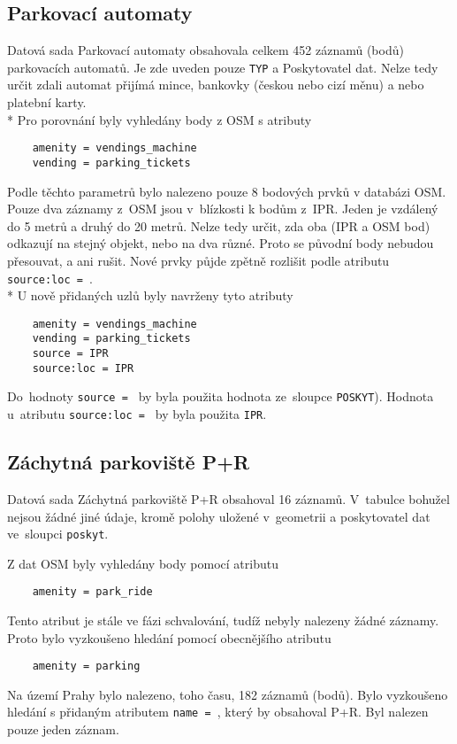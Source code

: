 \subsection{Parkovací automaty}
\label{Parkovací automaty}
Datová sada Parkovací automaty obsahovala celkem 452 záznamů (bodů)
parkovacích automatů. Je zde uveden pouze {\tt TYP} a Poskytovatel dat.
Nelze tedy určit zdali automat přijímá mince, bankovky (českou nebo
cizí měnu) a nebo platební karty.
\\*
Pro porovnání byly vyhledány body z OSM s atributy
\begin{verbatim}
    amenity = vendings_machine
    vending = parking_tickets
\end{verbatim}
Podle těchto parametrů bylo nalezeno pouze 8 bodových prvků v databázi
OSM. Pouze dva záznamy z~OSM jsou v~blízkosti k bodům z~IPR. Jeden je
vzdálený do 5 metrů a druhý do 20 metrů. Nelze tedy určit, zda oba (IPR
a OSM bod) odkazují na stejný objekt, nebo na dva různé. Proto se
původní body nebudou přesouvat, a ani rušit. Nové prvky půjde zpětně
rozlišit podle atributu {\tt source:loc~= }.
\\*
U nově přidaných uzlů byly navrženy tyto atributy
\begin{verbatim}
    amenity = vendings_machine
    vending = parking_tickets
    source = IPR
    source:loc = IPR
\end{verbatim}
Do~hodnoty {\tt source~= } by byla použita hodnota ze~sloupce
{\tt POSKYT}). Hodnota u~atributu {\tt source:loc~= } by byla použita
{\tt IPR}.

\subsection{Záchytná parkoviště P+R}
\label{Záchytná parkoviště P+R}
Datová sada Záchytná parkoviště P+R obsahoval 16 záznamů. V~tabulce
bohužel nejsou žádné jiné údaje, kromě polohy uložené v~geometrii a
poskytovatel dat ve~sloupci {\tt poskyt}.

Z dat OSM byly vyhledány body pomocí atributu
\begin{verbatim}
    amenity = park_ride
\end{verbatim}
Tento atribut je stále ve fázi schvalování, tudíž nebyly nalezeny
žádné záznamy. 
Proto bylo vyzkoušeno hledání pomocí obecnějšího atributu
\begin{verbatim}
    amenity = parking
\end{verbatim}
Na území Prahy bylo nalezeno, toho času, 182 záznamů (bodů). Bylo
vyzkoušeno hledání s přidaným atributem {\tt name~= }, který by
obsahoval P+R. Byl nalezen pouze jeden záznam.

